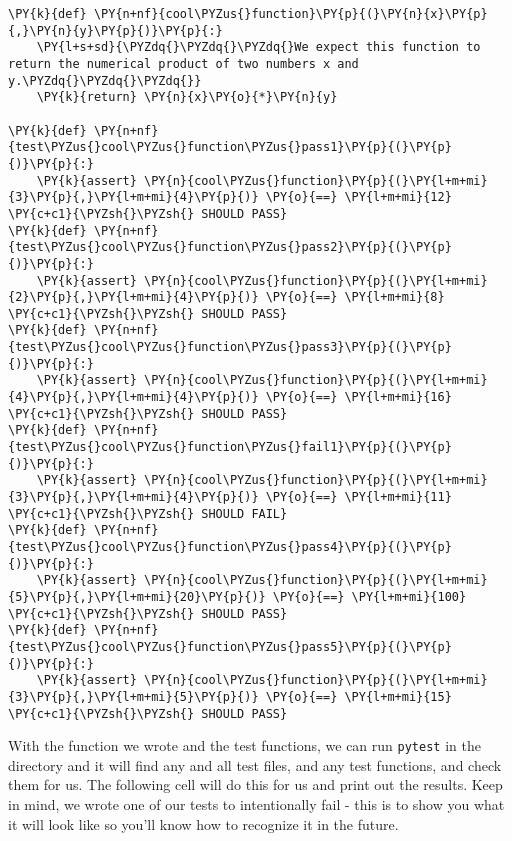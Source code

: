     \begin{tcolorbox}[breakable, size=fbox, boxrule=1pt, pad at break*=1mm,colback=cellbackground, colframe=cellborder]
\begin{Verbatim}[commandchars=\\\{\}]
\PY{k}{def} \PY{n+nf}{cool\PYZus{}function}\PY{p}{(}\PY{n}{x}\PY{p}{,}\PY{n}{y}\PY{p}{)}\PY{p}{:}
    \PY{l+s+sd}{\PYZdq{}\PYZdq{}\PYZdq{}We expect this function to return the numerical product of two numbers x and y.\PYZdq{}\PYZdq{}\PYZdq{}}
    \PY{k}{return} \PY{n}{x}\PY{o}{*}\PY{n}{y}

\PY{k}{def} \PY{n+nf}{test\PYZus{}cool\PYZus{}function\PYZus{}pass1}\PY{p}{(}\PY{p}{)}\PY{p}{:}
    \PY{k}{assert} \PY{n}{cool\PYZus{}function}\PY{p}{(}\PY{l+m+mi}{3}\PY{p}{,}\PY{l+m+mi}{4}\PY{p}{)} \PY{o}{==} \PY{l+m+mi}{12}  \PY{c+c1}{\PYZsh{}\PYZsh{} SHOULD PASS}
\PY{k}{def} \PY{n+nf}{test\PYZus{}cool\PYZus{}function\PYZus{}pass2}\PY{p}{(}\PY{p}{)}\PY{p}{:}
    \PY{k}{assert} \PY{n}{cool\PYZus{}function}\PY{p}{(}\PY{l+m+mi}{2}\PY{p}{,}\PY{l+m+mi}{4}\PY{p}{)} \PY{o}{==} \PY{l+m+mi}{8}  \PY{c+c1}{\PYZsh{}\PYZsh{} SHOULD PASS}
\PY{k}{def} \PY{n+nf}{test\PYZus{}cool\PYZus{}function\PYZus{}pass3}\PY{p}{(}\PY{p}{)}\PY{p}{:}
    \PY{k}{assert} \PY{n}{cool\PYZus{}function}\PY{p}{(}\PY{l+m+mi}{4}\PY{p}{,}\PY{l+m+mi}{4}\PY{p}{)} \PY{o}{==} \PY{l+m+mi}{16}  \PY{c+c1}{\PYZsh{}\PYZsh{} SHOULD PASS}
\PY{k}{def} \PY{n+nf}{test\PYZus{}cool\PYZus{}function\PYZus{}fail1}\PY{p}{(}\PY{p}{)}\PY{p}{:}
    \PY{k}{assert} \PY{n}{cool\PYZus{}function}\PY{p}{(}\PY{l+m+mi}{3}\PY{p}{,}\PY{l+m+mi}{4}\PY{p}{)} \PY{o}{==} \PY{l+m+mi}{11}  \PY{c+c1}{\PYZsh{}\PYZsh{} SHOULD FAIL}
\PY{k}{def} \PY{n+nf}{test\PYZus{}cool\PYZus{}function\PYZus{}pass4}\PY{p}{(}\PY{p}{)}\PY{p}{:}
    \PY{k}{assert} \PY{n}{cool\PYZus{}function}\PY{p}{(}\PY{l+m+mi}{5}\PY{p}{,}\PY{l+m+mi}{20}\PY{p}{)} \PY{o}{==} \PY{l+m+mi}{100}  \PY{c+c1}{\PYZsh{}\PYZsh{} SHOULD PASS}
\PY{k}{def} \PY{n+nf}{test\PYZus{}cool\PYZus{}function\PYZus{}pass5}\PY{p}{(}\PY{p}{)}\PY{p}{:}
    \PY{k}{assert} \PY{n}{cool\PYZus{}function}\PY{p}{(}\PY{l+m+mi}{3}\PY{p}{,}\PY{l+m+mi}{5}\PY{p}{)} \PY{o}{==} \PY{l+m+mi}{15}  \PY{c+c1}{\PYZsh{}\PYZsh{} SHOULD PASS}
\end{Verbatim}
\end{tcolorbox}

    With the function we wrote and the test functions, we can run
\texttt{pytest} in the directory and it will find any and all test
files, and any test functions, and check them for us. The following cell
will do this for us and print out the results. Keep in mind, we wrote
one of our tests to intentionally fail - this is to show you what it
will look like so you'll know how to recognize it in the future.

